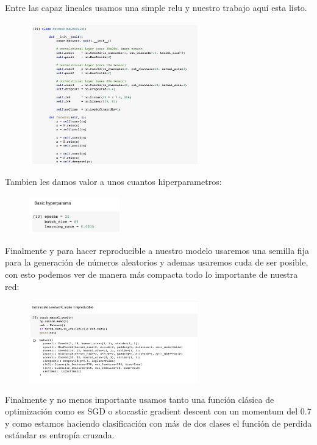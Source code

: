 \documentclass[12pt, fleqn]{report}                             %
\theoremstyle{break}                                            %
\begin{document}
        Entre las capaz lineales usamos una simple relu y nuestro trabajo aquí esta listo.
        \begin{figure}[h!]
            \includegraphics[width=0.65\textwidth]{6}
        \end{figure}

        \clearpage
        Tambien les damos valor a unos cuantos hiperparametros:
        \begin{figure}[h!]
            \includegraphics[width=0.35\textwidth]{5}
        \end{figure}

        Finalmente y para hacer reproducible a nuestro modelo usaremos una semilla fija para la generación de números aleatorios
        y ademas usaremos cuda de ser posible, con esto podemos ver de manera más compacta todo lo importante de nuestra red:
        \begin{figure}[h!]
            \includegraphics[width=0.65\textwidth]{7}
        \end{figure}

        Finalmente y no menos importante usamos tanto una función clásica de optimización como es SGD o stocastic gradient descent
        con un momentum del 0.7 y como estamos haciendo clasificación con más de dos clases el función de perdida estándar es
        entropía cruzada.
\end{document}
